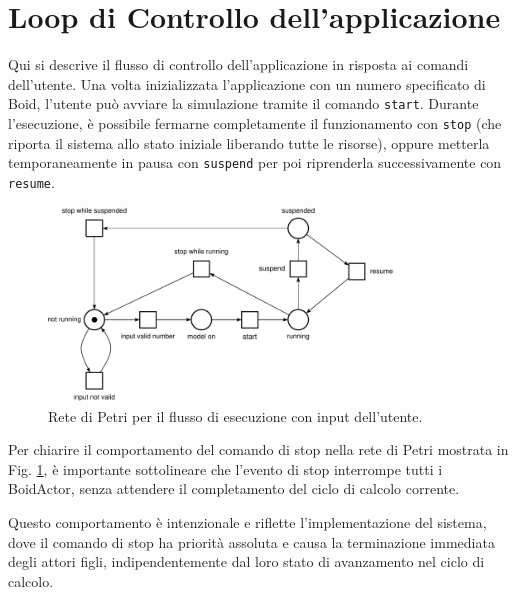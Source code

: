 \documentclass[a4paper,12pt]{report}
\begin{document}
    \section{Loop di Controllo dell'applicazione}
        Qui si descrive il flusso di controllo dell'applicazione in risposta ai comandi dell'utente.
        Una volta inizializzata l'applicazione con un numero specificato di Boid, l'utente può avviare la simulazione tramite il comando \texttt{start}. Durante l'esecuzione, è possibile fermarne completamente il funzionamento con \texttt{stop} (che riporta il sistema allo stato iniziale liberando tutte le risorse), oppure metterla temporaneamente in pausa con \texttt{suspend} per poi riprenderla successivamente con \texttt{resume}.
        \begin{figure}[ht!]
            \centering
            \includegraphics[width=\textwidth]{petri_nets_pdf/rete_app_flow.pdf}
            \caption{Rete di Petri per il flusso di esecuzione con input dell'utente.}
            \label{fig:rete_app_flow}
        \end{figure}
        
        Per chiarire il comportamento del comando di stop nella rete di Petri mostrata in Fig. \ref{fig:rete_app_flow}, è importante sottolineare che l'evento di stop interrompe tutti i BoidActor, senza attendere il completamento del ciclo di calcolo corrente.
        
        Questo comportamento è intenzionale e riflette l'implementazione del sistema, dove il comando di stop ha priorità assoluta e causa la terminazione immediata degli attori figli, indipendentemente dal loro stato di avanzamento nel ciclo di calcolo.
\end{document}
